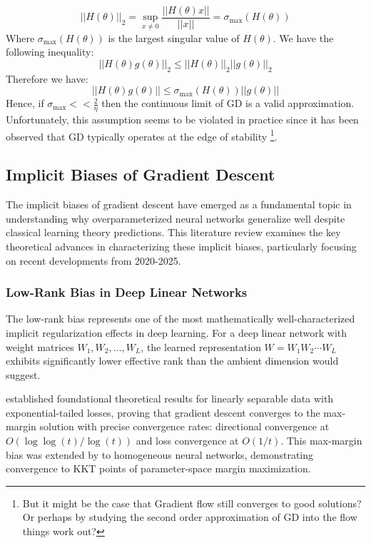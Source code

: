 \documentclass[11pt]{article}
\begin{document}
\begin{equation}
||H(\theta)||_2 = \sup_{x \neq 0} \frac{||H(\theta)x||}{||x||} = \sigma_{\max}(H(\theta))
\end{equation}
Where $\sigma_{\max}(H(\theta))$ is the largest singular value of $H(\theta)$.
We have the following inequality:
\begin{equation}
||H(\theta)g(\theta)||_2 \leq ||H(\theta)||_2 ||g(\theta)||_2
\end{equation}
Therefore we have:
\begin{equation}
||H(\theta)g(\theta)|| \leq \sigma_{\max}(H(\theta)) ||g(\theta)||
\end{equation}
Hence, if $\sigma_{\max} << \frac{2}{\eta}$ then the continuous limit of GD is a valid approximation. Unfortunately, this assumption seems to be violated in practice since it has been observed that GD typically operates at the edge of stability \footnote{But it might be the case that Gradient flow still converges to good solutions? Or perhaps by studying the second order approximation of GD into the flow things work out?}.
\subsection*{Implicit Biases of Gradient Descent}
The implicit biases of gradient descent have emerged as a fundamental topic in understanding why overparameterized neural networks generalize well despite classical learning theory predictions. This literature review examines the key theoretical advances in characterizing these implicit biases, particularly focusing on recent developments from 2020-2025.
\subsubsection{Low-Rank Bias in Deep Linear Networks}

The low-rank bias represents one of the most mathematically well-characterized implicit regularization effects in deep learning. For a deep linear network with weight matrices $W_1, W_2, \ldots, W_L$, the learned representation $W = W_1 W_2 \cdots W_L$ exhibits significantly lower effective rank than the ambient dimension would suggest.

\citet{soudry2018implicit} established foundational theoretical results for linearly separable data with exponential-tailed losses, proving that gradient descent converges to the max-margin solution with precise convergence rates: directional convergence at $O(\log \log(t)/\log(t))$ and loss convergence at $O(1/t)$. This max-margin bias was extended by \citet{lyu2019gradient} to homogeneous neural networks, demonstrating convergence to KKT points of parameter-space margin maximization.
\end{document}
